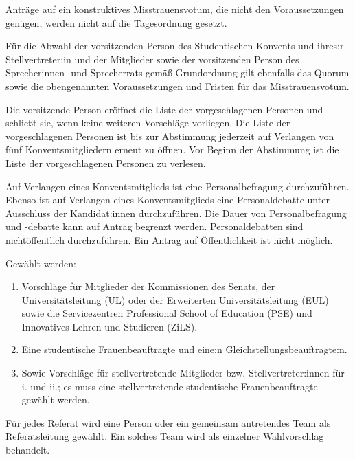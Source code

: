 \documentclass[10pt,a4paper]{scrartcl}
\begin{document}
\begin{contract}
  Anträge auf ein konstruktives Misstrauensvotum, die nicht den
  Voraussetzungen genügen, werden nicht auf die Tagesordnung gesetzt.
     
  Für die Abwahl der vorsitzenden Person des Studentischen Konvents und
  ihres:r Stellvertreter:in und der Mitglieder sowie der vorsitzenden
  Person des Sprecherinnen- und Sprecherrats gemäß Grundordnung gilt
  ebenfalls das Quorum sowie die obengenannten Voraussetzungen und
  Fristen für das Misstrauensvotum.


\label{vorschlagsliste}

Die vorsitzende Person eröffnet die Liste der vorgeschlagenen Personen
und schließt sie, wenn keine weiteren Vorschläge vorliegen. Die Liste
der vorgeschlagenen Personen ist bis zur Abstimmung jederzeit auf
Verlangen von fünf Konventsmitgliedern erneut zu öffnen. Vor Beginn der
Abstimmung ist die Liste der vorgeschlagenen Personen zu verlesen.


\label{personalbefragung-und-personaldebatte}

Auf Verlangen eines Konventsmitglieds ist eine Personalbefragung
durchzuführen. Ebenso ist auf Verlangen eines Konventsmitglieds eine
Personaldebatte unter Ausschluss der Kandidat:innen durchzuführen. Die
Dauer von Personalbefragung und -debatte kann auf Antrag begrenzt
werden. Personaldebatten sind nichtöffentlich durchzuführen. Ein Antrag
auf Öffentlichkeit ist nicht möglich.


\label{wahl-von-referaten-und-kommissionsmitgliedern}

Gewählt werden: 
\begin{enumerate}
\item 
	Vorschläge für Mitglieder der
Kommissionen des Senats, der Universitätsleitung (UL) oder der
Erweiterten Universitätsleitung (EUL) sowie die Servicezentren
Professional School of Education (PSE) und Innovatives Lehren und
Studieren (ZiLS).
\item 
	Eine studentische Frauenbeauftragte und eine:n
Gleichstellungsbeauftragte:n. 
\item 
	Sowie Vorschläge für stellvertretende
Mitglieder bzw. Stellvertreter:innen für i. und ii.; es muss eine
stellvertretende studentische Frauenbeauftragte gewählt werden.

\end{enumerate}

Für
jedes Referat wird eine Person oder ein gemeinsam antretendes Team als
Referatsleitung gewählt. Ein solches Team wird als einzelner
Wahlvorschlag behandelt.


\end{contract}
\end{document}
